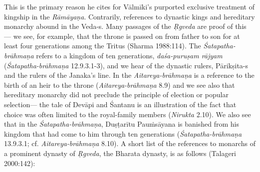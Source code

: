This is the primary reason he cites for Vālmīki’s purported exclusive treatment of kingship in the {\sl Rāmāyaṇa}. Contrarily, references to dynastic kings and hereditary monarchy abound in the Veda-s. Many passages of the {\sl Ṛgveda} are proof of this --- we see, for example, that the throne is passed on from father to son for at least four generations among the Tritus (Sharma 1988:114). The {\sl Śatapatha-brāhmaṇa} refers to a kingdom of ten generations, {\sl daśa-puruṣam rājyam} ({\sl Śatapatha-brāhmaṇa} 12.9.3.1-3), and we hear of the dynastic rulers, \hbox{Pārikṣita-s} and the rulers of the Janaka’s line. In the {\sl Aitareya-brāhmaṇa}  is a reference to the birth of an heir to the throne ({\sl Aitareya-brāhmaṇa} 8.9) and we see also that hereditary monarchy did not preclude the principle of election or popular selection--- the tale of Devāpi and Śantanu is an illustration of the fact that choice was often limited to the royal-family members ({\sl Nirukta} 2.10). We also see that in the {\sl Śatapatha-brāhmaṇa},
 Duṣṭarītu Pauṁsāyana is banished from his kingdom that had come to him through ten generations ({\sl Śatapatha-brāhmaṇa} 13.9.3.1; cf. {\sl Aitareya-brāhmaṇa} 8.10). A short list of the references to monarchs of a prominent dynasty of {\sl Ṛgveda}, the Bharata dynasty, is as follows (Talageri 2000:142):
